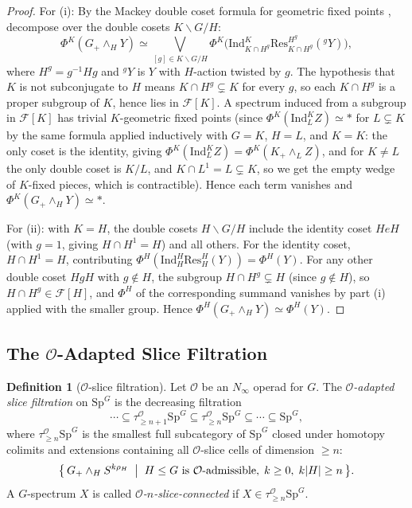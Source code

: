 \documentclass[12pt]{article}
\theoremstyle{definition}
\newtheorem{definition}[theorem]{Definition}
\newcommand{\calO}{\mathcal{O}}
\newcommand{\SpG}{\mathrm{Sp}^G}
\begin{document}
\begin{proof}
For (i): By the Mackey double coset formula for geometric fixed points
\cite[Proposition 2.17]{HHR2016}, decompose over the double cosets $K \backslash G / H$:
\[
  \Phi^K(G_+ \wedge_H Y)
  \simeq \bigvee_{[g] \in K\backslash G/H}
  \Phi^K\!\bigl(\mathrm{Ind}_{K \cap H^g}^K \mathrm{Res}_{K\cap H^g}^{H^g}({}^g Y)\bigr),
\]
where $H^g = g^{-1}Hg$ and ${}^gY$ is $Y$ with $H$-action twisted by $g$. The hypothesis
that $K$ is not subconjugate to $H$ means $K \cap H^g \subsetneq K$ for every $g$, so each
$K \cap H^g$ is a proper subgroup of $K$, hence lies in $\mathcal{F}[K]$. A spectrum induced
from a subgroup in $\mathcal{F}[K]$ has trivial $K$-geometric fixed points (since
$\Phi^K(\mathrm{Ind}_{L}^K Z) \simeq *$ for $L \subsetneq K$ by the same formula applied
inductively with $G = K$, $H = L$, and $K = K$: the only coset is the identity, giving
$\Phi^K(\mathrm{Ind}_L^K Z) = \Phi^K(K_+ \wedge_L Z)$, and for $K \neq L$ the only double
coset is $K/L$, and $K \cap L^1 = L \subsetneq K$, so we get the empty wedge of $K$-fixed
pieces, which is contractible). Hence each term vanishes and $\Phi^K(G_+ \wedge_H Y) \simeq *$.

For (ii): with $K = H$, the double cosets $H \backslash G / H$ include the identity coset
$HeH$ (with $g = 1$, giving $H \cap H^1 = H$) and all others. For the identity coset,
$H \cap H^1 = H$, contributing $\Phi^H(\mathrm{Ind}_H^H \mathrm{Res}_H^H(Y)) = \Phi^H(Y)$.
For any other double coset $HgH$ with $g \notin H$, the subgroup $H \cap H^g \subsetneq H$
(since $g \notin H$), so $H \cap H^g \in \mathcal{F}[H]$, and $\Phi^H$ of the corresponding
summand vanishes by part (i) applied with the smaller group. Hence
$\Phi^H(G_+ \wedge_H Y) \simeq \Phi^H(Y)$.
\end{proof}

\subsection{The \texorpdfstring{$\calO$}{O}-Adapted Slice Filtration}

\begin{definition}[$\calO$-slice filtration]
\label{def:O-slice-filtration}
Let $\calO$ be an $N_\infty$ operad for $G$. The \emph{$\calO$-adapted slice filtration} on
$\SpG$ is the decreasing filtration
\[
  \cdots \subseteq \tau_{\geq n+1}^{\calO}\SpG \subseteq \tau_{\geq n}^{\calO}\SpG
  \subseteq \cdots \subseteq \SpG,
\]
where $\tau_{\geq n}^{\calO}\SpG$ is the smallest full subcategory of $\SpG$ closed under
homotopy colimits and extensions containing all $\calO$-slice cells of dimension $\geq n$:
\begin{equation}
\label{eq:O-slice-cells-set}
  \bigl\{\, G_+ \wedge_H S^{k\rho_H} \;\bigm|\;
  H \leq G \text{ is $\calO$-admissible},\; k \geq 0,\; k|H| \geq n \,\bigr\}.
\end{equation}
A $G$-spectrum $X$ is called \emph{$\calO$-$n$-slice-connected} if $X \in
\tau_{\geq n}^{\calO}\SpG$.
\end{definition}
\end{document}
